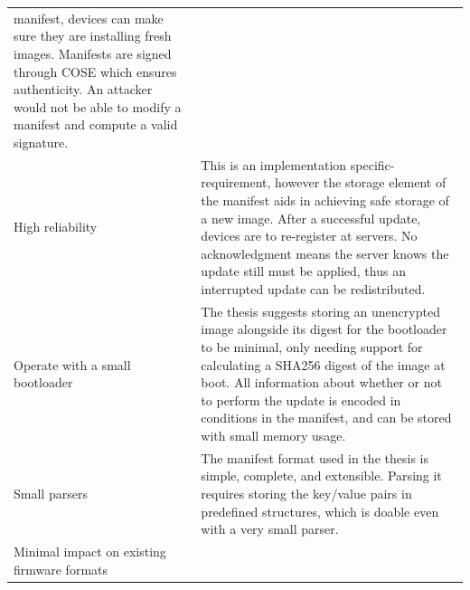 \documentclass[0-thesis.tex]{subfiles}
\begin{document}
\begin{small}
\begin{longtable}[]{@{}ll@{}}
\begin{minipage}[t]{0.53\columnwidth}
    manifest, devices can make sure they are installing fresh images.
    Manifests are signed through COSE which ensures authenticity. An
    attacker would not be able to modify a manifest and compute a
    valid signature.\strut
    \end{minipage}\tabularnewline
    \begin{minipage}[t]{0.41\columnwidth}\raggedright\strut
    High reliability\strut
    \end{minipage} & \begin{minipage}[t]{0.53\columnwidth}\raggedright\strut
    This is an implementation specific-requirement, however the storage
    element of the manifest aids in achieving safe storage of a new image.
    After a successful update, devices are to re-register at servers. No
    acknowledgment means the server knows the update still must be applied,
    thus an interrupted update can be redistributed.\strut
    \end{minipage}\tabularnewline
    \begin{minipage}[t]{0.41\columnwidth}\raggedright\strut
    Operate with a small bootloader\strut
    \end{minipage} & \begin{minipage}[t]{0.53\columnwidth}\raggedright\strut
    The thesis suggests storing an unencrypted image alongside its digest
    for the bootloader to be minimal, only needing support for calculating a
    SHA256 digest of the image at boot. All information about whether or not
    to perform the update is encoded in conditions in the manifest, and can
    be stored with small memory usage.\strut
    \end{minipage}\tabularnewline
    \begin{minipage}[t]{0.41\columnwidth}\raggedright\strut
    Small parsers\strut
    \end{minipage} & \begin{minipage}[t]{0.53\columnwidth}\raggedright\strut
    The manifest format used in the thesis is simple, complete, and
    extensible. Parsing it requires storing the key/value pairs in
    predefined structures, which is doable even with a very small
    parser.\strut
    \end{minipage}\tabularnewline
    \begin{minipage}[t]{0.41\columnwidth}\raggedright\strut
    Minimal impact on existing firmware formats\strut
    \end{minipage} & \begin{minipage}[t]{0.53\columnwidth}\raggedright\strut

\end{minipage}
\end{longtable}
\end{small}
\end{document}
